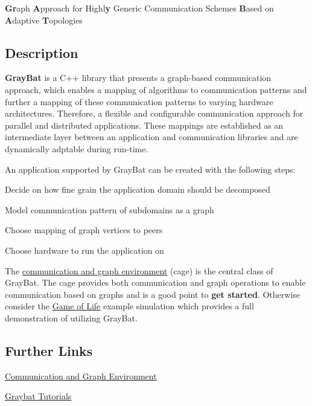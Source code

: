 {\bfseries Gr}aph {\bfseries A}pproach for Highl{\bfseries y} Generic Communication Schemes {\bfseries B}ased on {\bfseries A}daptive {\bfseries T}opologies

\subsection*{Description}

{\bfseries Gray\+Bat} is a C++ library that presents a graph-\/based communication approach, which enables a mapping of algorithms to communication patterns and further a mapping of these communication patterns to varying hardware architectures. Therefore, a flexible and configurable communication approach for parallel and distributed applications. These mappings are established as an intermediate layer between an application and communication libraries and are dynamically adptable during run-\/time.

An application supported by Gray\+Bat can be created with the following steps\+:


\begin{DoxyEnumerate}
\item Decide on how fine grain the application domain should be decomposed
\item Model communication pattern of subdomains as a graph
\item Choose mapping of graph vertices to peers
\item Choose hardware to run the application on
\end{DoxyEnumerate}



The \hyperlink{cage}{communication and graph environment} (cage) is the central class of Gray\+Bat. The cage provides both communication and graph operations to enable communication based on graphs and is a good point to {\bfseries get started}. Otherwise consider the \hyperlink{gol}{Game of Life} example simulation which provides a full demonstration of utilizing Gray\+Bat.

\subsection*{Further Links}


\begin{DoxyItemize}
\item \hyperlink{cage}{Communication and Graph Environment}
\item \hyperlink{tutorial}{Graybat Tutorials} 
\end{DoxyItemize}